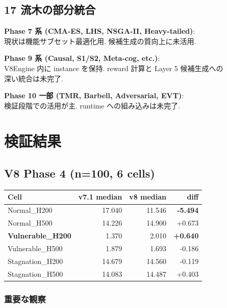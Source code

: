 \documentclass[a4paper,11pt]{report}
\begin{document}
\section{17 流木の部分統合}

\textbf{Phase 7 系 (CMA-ES, LHS, NSGA-II, Heavy-tailed)}:\\
現状は機能サブセット最適化用. 候補生成の質向上に未活用.

\textbf{Phase 9 系 (Causal, S1/S2, Meta-cog, etc.)}:\\
V8Engine 内に instance を保持. reward 計算と Layer 5 候補生成への\\
深い統合は未完了.

\textbf{Phase 10 一部 (TMR, Barbell, Adversarial, EVT)}:\\
検証段階での活用が主. runtime への組み込みは未完了.

\chapter{検証結果}

\section{V8 Phase 4 (n=100, 6 cells)}

\begin{longtable}{l r r r}
\toprule
Cell & v7.1 median & v8 median & diff \\
\midrule
Normal\_H200 & 17.040 & 11.546 & \textcolor{warning}{\textbf{-5.494}} \\
Normal\_H500 & 14.226 & 14.900 & \textcolor{success}{+0.673} \\
\textbf{Vulnerable\_H200} & 1.370 & 2.010 & \textcolor{success}{\textbf{+0.640}} \\
Vulnerable\_H500 & 1.879 & 1.693 & -0.186 \\
Stagnation\_H200 & 14.679 & 14.560 & -0.119 \\
Stagnation\_H500 & 14.083 & 14.487 & \textcolor{success}{+0.403} \\
\bottomrule
\end{longtable}

\subsection{重要な観察}
\end{document}
